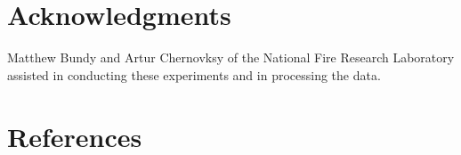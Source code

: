 \documentclass[12pt]{article}
\begin{document}


\pagebreak

\section*{Acknowledgments}

\noindent Matthew Bundy and Artur Chernovksy of the National Fire Research Laboratory assisted in conducting these experiments and in processing the data.   \\

\section*{References}



\end{document}
